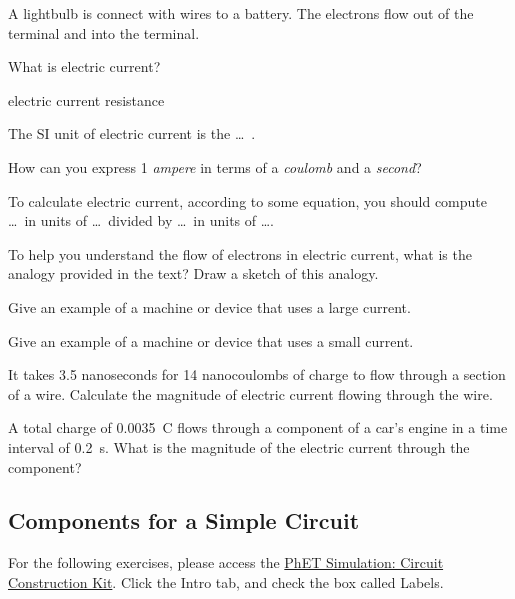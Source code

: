 \documentclass[]{exam}
\begin{document}
\begin{questions}
\question
A lightbulb is connect with wires to a battery. The electrons flow out of the \fillin[negative ] terminal and into the \fillin[positive ] terminal.


\question
What is electric current?

\begin{randomizechoices}
    \correctchoice \glsdesc{electric current}
    \choice \glsdesc{resistance}
\end{randomizechoices}


\question
The SI unit of electric current is the \dots\ .


\question
How can you express 1 \textit{ampere} in terms of a \textit{coulomb} and a \textit{second}?


\question
To calculate electric current, according to some equation, you should compute \dots\ in units of \dots\ divided by \dots\ in units of \dots .


\question
To help you understand the flow of electrons in electric current, what is the analogy provided in the text? Draw a sketch of this analogy.


\question
Give an example of a machine or device that uses a large current.


\question
Give an example of a machine or device that uses a small current.


\question
It takes 3.5 nanoseconds for 14 nanocoulombs of charge to flow through a section of a wire. Calculate the magnitude of electric current flowing through the wire.


\question
A total charge of \qty{0.0035}{C} flows through a component of a car's engine in a time interval of \qty{0.2}{s}. What is the magnitude of the electric current through the component?

\end{questions}

\clearpage

\subsection*{Components for a Simple Circuit}

For the following exercises, please access the \href{https://phet.colorado.edu/sims/html/circuit-construction-kit-dc/latest/circuit-construction-kit-dc_en.html}{PhET Simulation: Circuit Construction Kit}. Click the Intro tab, and check the box called Labels.
\end{document}
